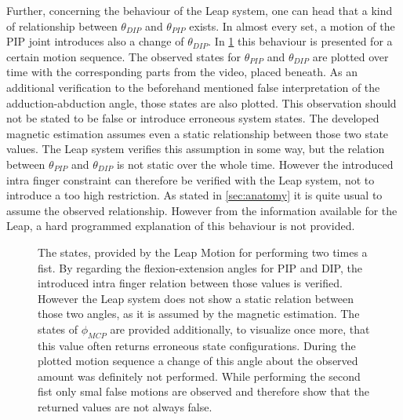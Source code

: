 Further, concerning the behaviour of the Leap system, one can head that a kind of relationship between $ \theta_{DIP} $ and $ \theta_{PIP} $ exists. In almost every set, a motion of the \ac{PIP} joint introduces also a change of $ \theta_{DIP} $. In \ref{fig:set14} this behaviour is presented for a certain motion sequence. The observed states for $ \theta_{PIP} $ and $ \theta_{DIP} $ are plotted over time with the corresponding parts from the video, placed beneath. As an additional verification to the beforehand mentioned false interpretation of the adduction-abduction angle, those states are also plotted. This observation should not be stated to be false or introduce erroneous system states. The developed magnetic estimation assumes even a static relationship between those two state values. The Leap system verifies this assumption in some way, but the relation between $ \theta_{PIP} $ and $ \theta_{DIP} $ is not static over the whole time. However the introduced intra finger constraint can therefore be verified with the Leap system, not to introduce a too high restriction. As stated in \ref{sec:anatomy} it is quite usual to assume the observed relationship. However from the information available for the Leap, a hard programmed explanation of this behaviour is not provided.\\
\begin{figure}[!htb]
\centering
{}
\caption[Relationship between $ \theta_{PIP} $ and $ \theta_{DIP} $ observed by Leap Motion]
{The states, provided by the Leap Motion for performing two times a fist. By regarding the flexion-extension angles for \ac{PIP} and \ac{DIP}, the introduced intra finger relation between those values is verified. However the Leap system does not show a static relation between those two angles, as it is assumed by the magnetic estimation. The states of $ \phi_{MCP} $ are provided additionally, to visualize once more, that this value often returns erroneous state configurations. During the plotted motion sequence a change of this angle about the observed amount was definitely not performed. While performing the second fist only smal false motions are observed and therefore show that the returned values are not always false.}
\label{fig:set14}
\end{figure}
